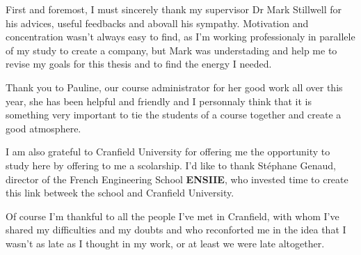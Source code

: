 First and foremost, I must sincerely thank my supervisor Dr Mark Stillwell for
his advices, useful feedbacks and abovall his sympathy. Motivation and
concentration wasn't always easy to find, as I'm working professionaly in
parallele of my study to create a company, but Mark was understading and help
me to revise my goals for this thesis and to find the energy I needed.

Thank you to Pauline, our course administrator for her good work all over this
year, she has been helpful and friendly and I personnaly think that it is
something very important to tie the students of a course together and create
a good atmosphere.

I am also grateful to Cranfield University for offering me the opportunity to
study here by offering to me a scolarship. I'd like to thank Stéphane Genaud,
director of the French Engineering School \textbf{ENSIIE}, who invested time to
create this link betweek the school and Cranfield University.

Of course I'm thankful to all the people I've met in Cranfield, with whom I've
shared my difficulties and my doubts and who reconforted me in the idea that I
wasn't as late as I thought in my work, or at least we were late altogether.
